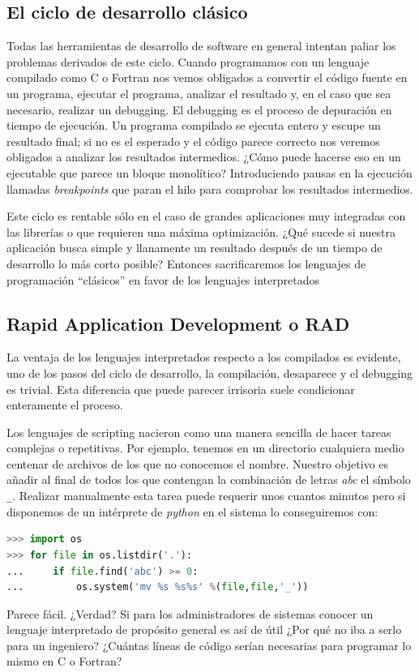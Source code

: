 \subsection{El ciclo de desarrollo clásico}

Todas las herramientas de desarrollo de software en general intentan
paliar los problemas derivados de este ciclo. Cuando programamos con
un lenguaje compilado como C o Fortran nos vemos obligados a convertir
el código fuente en un programa, ejecutar el programa, analizar el
resultado y, en el caso que sea necesario, realizar un debugging.  El
debugging es el proceso de depuración en tiempo de ejecución. Un
programa compilado se ejecuta entero y escupe un resultado final; si
no es el esperado y el código parece correcto nos veremos obligados a
analizar los resultados intermedios. ¿Cómo puede hacerse eso en un
ejecutable que parece un bloque monolítico? Introduciendo pausas en la
ejecución llamadas \emph{breakpoints} que paran el hilo para comprobar
los resultados intermedios.

Este ciclo es rentable sólo en el caso de grandes aplicaciones muy
integradas con las librerías o que requieren una máxima optimización.
¿Qué sucede si nuestra aplicación busca simple y llanamente un
resultado después de un tiempo de desarrollo lo más corto posible?
Entonces sacrificaremos los lenguajes de programación {}``clásicos''
en favor de los lenguajes interpretados


\subsection{Rapid Application Development o RAD}

La ventaja de los lenguajes interpretados respecto a los compilados es
evidente, uno de los pasos del ciclo de desarrollo, la compilación,
desaparece y el debugging es trivial. Esta diferencia que puede
parecer irrisoria suele condicionar enteramente el proceso.

Los lenguajes de scripting nacieron como una manera sencilla de hacer
tareas complejas o repetitivas. Por ejemplo, tenemos en un directorio
cualquiera medio centenar de archivos de los que no conocemos el nombre.
Nuestro objetivo es añadir al final de todos los que contengan la
combinación de letras \emph{abc} el símbolo \texttt{\_}. Realizar
manualmente esta tarea puede requerir unos cuantos minutos pero si
disponemos de un intérprete de \emph{python} en el sistema lo
conseguiremos con:

\begin{lstlisting}[language=Python]
>>> import os
>>> for file in os.listdir('.'):
...     if file.find('abc') >= 0:
...         os.system('mv %s %s%s' %(file,file,'_'))
\end{lstlisting}
Parece fácil. ¿Verdad? Si para los administradores de sistemas
conocer un lenguaje interpretado de propósito general es así de útil
¿Por qué no iba a serlo para un ingeniero? ¿Cuántas líneas de código
serían necesarias para programar lo mismo en C o Fortran?

